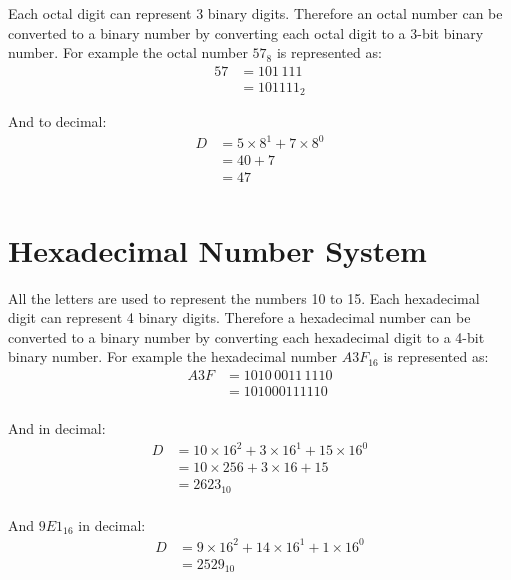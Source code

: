 \documentclass[12pt letter]{report}
\begin{document}
Each octal digit can represent 3 binary digits. Therefore an octal number can be converted to a binary number by converting
each octal digit to a 3-bit binary number. For example the octal number $57_8$ is represented as:
\begin{align*}
  57 & = 101\, 111 \\
     & = 101111_2
\end{align*}

And to decimal:
\begin{align*}
  D & = 5 \times 8^{1} + 7 \times 8^{0} \\
    & = 40 + 7                          \\
    & = 47                              \\
\end{align*}

\section{Hexadecimal Number System}


All the letters are used to represent the numbers 10 to 15.
Each hexadecimal digit can represent 4 binary digits. Therefore a hexadecimal number can be converted to a binary number
by converting each hexadecimal digit to a 4-bit binary number. For example the hexadecimal number $A3F_{16}$ is
represented as:
\begin{align*}
  A3F & = 1010\,0011\,1110 \\
      & = 101000111110     \\
\end{align*}

And in decimal:
\begin{align*}
  D & = 10 \times 16^{2} + 3 \times 16^{1} + 15 \times 16^{0} \\
    & = 10 \times 256 + 3 \times 16 + 15                      \\
    & = 2623_{10}                                             \\
\end{align*}

And $9E1_{16}$ in decimal:
\begin{align*}
  D & = 9 \times 16^{2} + 14 \times 16^{1} + 1 \times 16^{0} \\
    & = 2529_{10}                                            \\
\end{align*}
\end{document}
